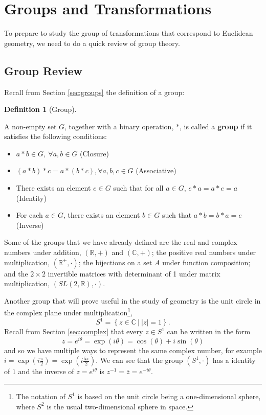 \documentclass[
]{book}
\providecommand{\tightlist}{%
  \setlength{\itemsep}{0pt}\setlength{\parskip}{0pt}}
\theoremstyle{definition}
\newtheorem{definition}{Definition}[chapter]
\theoremstyle{definition}
\theoremstyle{definition}
\theoremstyle{definition}
\theoremstyle{remark}
\begin{document}
\hypertarget{groups-and-transformations}{%
\section{Groups and Transformations}\label{groups-and-transformations}}

To prepare to study the group of transformations that correspond to Euclidean geometry, we need to do a quick review of group theory.

\hypertarget{group-review}{%
\subsection{Group Review}\label{group-review}}

Recall from Section \ref{sec:groups} the definition of a group:

\begin{definition}[Group]
\protect\hypertarget{def:unlabeled-div-214}{}\label{def:unlabeled-div-214}

A non-empty set \(G\), together with a binary operation, \(*\), is called a \textbf{group} if it satisfies the following conditions:

\begin{itemize}
\tightlist
\item
  \(a*b \in G, \: \forall a,b \in G\) (Closure)
\item
  \((a*b)*c = a * (b*c), \forall a,b,c \in G\) (Associative)
\item
  There exists an element \(e \in G\) such that for all \(a\in G\), \(e*a=a*e=a\) (Identity)
\item
  For each \(a\in G\), there exists an element \(b\in G\) such that \(a*b=b*a=e\) (Inverse)
\end{itemize}

\end{definition}

Some of the groups that we have already defined are the real and complex numbers under addition, \((\mathbb{R},+)\) and \((\mathbb{C},+)\); the positive real numbers under multiplication, \((\mathbb{R}^+, \cdot)\); the bijections on a set \(A\) under function composition; and the \(2\times 2\) invertible matrices with determinant of 1 under matrix multiplication, \((SL(2,\mathbb{R}),\cdot)\).

Another group that will prove useful in the study of geometry is the unit circle in the complex plane under multiplication\footnote{The notation of $S^1$ is based on the unit circle being a one-dimensional sphere, where $S^2$ is the usual two-dimensional sphere in space.}, \[S^1 = \left\{ z\in \mathbb{C}\: \vert \: |z|=1\right\}.\] Recall from Section \ref{sec:complex} that every \(z\in S^1\) can be written in the form \[z= e^{i\theta} = \exp(i\theta)= \cos (\theta) + i \sin(\theta)\] and so we have multiple ways to represent the same complex number, for example \(i=\exp\left(i\frac{\pi}{2}\right)= \exp \left( i \frac{5\pi}{2}\right)\). We can see that the group \((S^1,\cdot)\) has a identity of \(1\) and the inverse of \(z=e^{i\theta}\) is \(z^{-1}=\overline{z} = e^{-i\theta}\).
\end{document}
